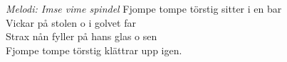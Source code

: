 {\footnotesize\textit{Melodi: Imse vime spindel}}
Fjompe tompe törstig sitter i en bar\\
Vickar på stolen o i golvet far\\
Strax nån fyller på hans glas o sen\\
Fjompe tompe törstig klättrar upp igen.
